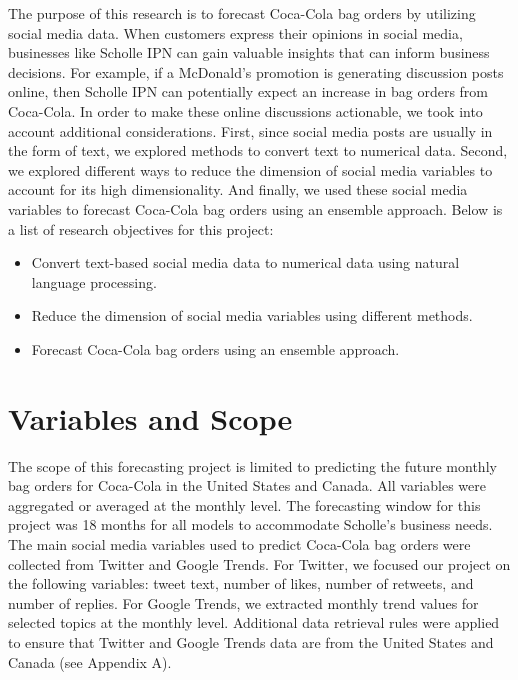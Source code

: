 \documentclass[12pt,oneside]{chicagocapstone}
\providecommand{\tightlist}{%
  \setlength{\itemsep}{0pt}\setlength{\parskip}{0pt}}
\begin{document}
The purpose of this research is to forecast Coca-Cola bag orders by utilizing social media data. When customers express their opinions in social media, businesses like Scholle IPN can gain valuable insights that can inform business decisions. For example, if a McDonald's promotion is generating discussion posts online, then Scholle IPN can potentially expect an increase in bag orders from Coca-Cola. In order to make these online discussions actionable, we took into account additional considerations. First, since social media posts are usually in the form of text, we explored methods to convert text to numerical data. Second, we explored different ways to reduce the dimension of social media variables to account for its high dimensionality. And finally, we used these social media variables to forecast Coca-Cola bag orders using an ensemble approach. Below is a list of research objectives for this project:
\begin{itemize}
\tightlist
\item
  Convert text-based social media data to numerical data using natural language processing.
\item
  Reduce the dimension of social media variables using different methods.
\item
  Forecast Coca-Cola bag orders using an ensemble approach.
\end{itemize}
\hypertarget{variables-and-scope}{%
\section*{Variables and Scope}\label{variables-and-scope}}

The scope of this forecasting project is limited to predicting the future monthly bag orders for Coca-Cola in the United States and Canada. All variables were aggregated or averaged at the monthly level. The forecasting window for this project was 18 months for all models to accommodate Scholle's business needs. The main social media variables used to predict Coca-Cola bag orders were collected from Twitter and Google Trends. For Twitter, we focused our project on the following variables: tweet text, number of likes, number of retweets, and number of replies. For Google Trends, we extracted monthly trend values for selected topics at the monthly level. Additional data retrieval rules were applied to ensure that Twitter and Google Trends data are from the United States and Canada (see Appendix A).
\end{document}
